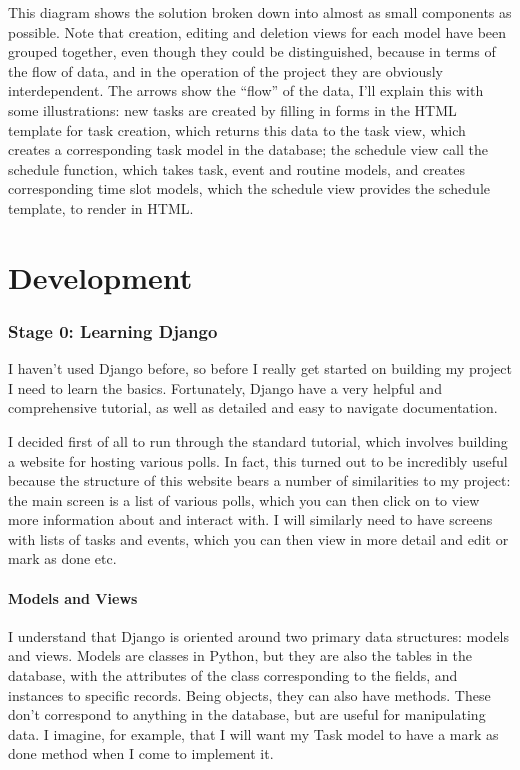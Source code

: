 \documentclass{article}
\begin{document}
This diagram shows the solution broken down into almost as small components as possible.
Note that creation, editing and deletion views for each model have been grouped together,
even though they could be distinguished,
because in terms of the flow of data,
and in the operation of the project they are obviously interdependent.
The arrows show the ``flow'' of the data,
I'll explain this with some illustrations:
new tasks are created by filling in forms in the HTML template for task creation,
which returns this data to the task view,
which creates a corresponding task model in the database;
the schedule view call the schedule function,
which takes task, event and routine models,
and creates corresponding time slot models,
which the schedule view provides the schedule template,
to render in HTML.

\part{Development}
\section{Stage 0: Learning Django}
I haven't used Django before,
so before I really get started on building my project I need to learn the basics.
Fortunately, Django have a very helpful and comprehensive tutorial,
as well as detailed and easy to navigate documentation.

I decided first of all to run through the standard tutorial,
which involves building a website for hosting various polls.
In fact, this turned out to be incredibly useful because the structure of this website bears a number of similarities to my project:
the main screen is a list of various polls,
which you can then click on to view more information about and interact with.
I will similarly need to have screens with lists of tasks and events,
which you can then view in more detail and edit or mark as done etc.

\subsection{Models and Views}
I understand that Django is oriented around two primary data structures:
models and views.
Models are classes in Python,
but they are also the tables in the database,
with the attributes of the class corresponding to the fields,
and instances to specific records.
Being objects, they can also have methods.
These don't correspond to anything in the database,
but are useful for manipulating data.
I imagine, for example, that I will want my Task model to have a mark as done method when I come to implement it.
\end{document}
